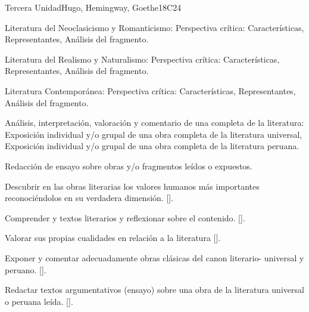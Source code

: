 \begin{syllabus}
\begin{unit}{}{Tercera Unidad}{Hugo, Hemingway, Goethe}{18}{C24}
\begin{topics}
	\item Literatura del Neoclasicismo y Romanticismo: Perspectiva crítica: Características, Representantes, Análisis del fragmento.
	\item Literatura del Realismo y Naturalismo: Perspectiva crítica: Características, Representantes, Análisis del fragmento.
	\item Literatura Contemporánea: Perspectiva crítica: Características, Representantes, Análisis del fragmento.
	\item Análisis, interpretación, valoración y comentario de una completa de la literatura: Exposición individual y/o grupal de una obra completa de la literatura universal, Exposición individual y/o grupal de una obra  completa de la literatura peruana.
	\item Redacción de ensayo sobre obras y/o fragmentos leídos o expuestos.
\end{topics}
\begin{learningoutcomes}
	\item Descubrir en las obras literarias los valores humanos más importantes reconociéndolos en su verdadera dimensión. [\Usage].
	\item Comprender y textos literarios y reflexionar sobre el contenido. [\Usage].
	\item Valorar sus propias cualidades en relación a la literatura [\Usage].
	\item Exponer y comentar adecuadamente  obras clásicas del canon literario- universal y peruano. [\Usage].
	\item Redactar textos argumentativos (ensayo) sobre una obra de la literatura universal o peruana leída. [\Usage].
\end{learningoutcomes}
\end{unit}



\begin{coursebibliography}
\end{coursebibliography}
\end{syllabus}

